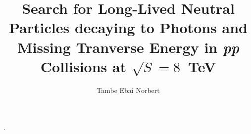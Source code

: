 \phd. %
\title{\bf Search for Long-Lived Neutral Particles decaying to Photons and Missing Tranverse Energy in \textit{pp} Collisions at $\sqrt{S} = 8$~TeV
    }
\author{Tambe Ebai Norbert}


\copyrightpage %

\abstract{}

\acknowledgements{}
\dedication{}


\beforepreface 

\figurespage
\tablespage

\afterpreface            
